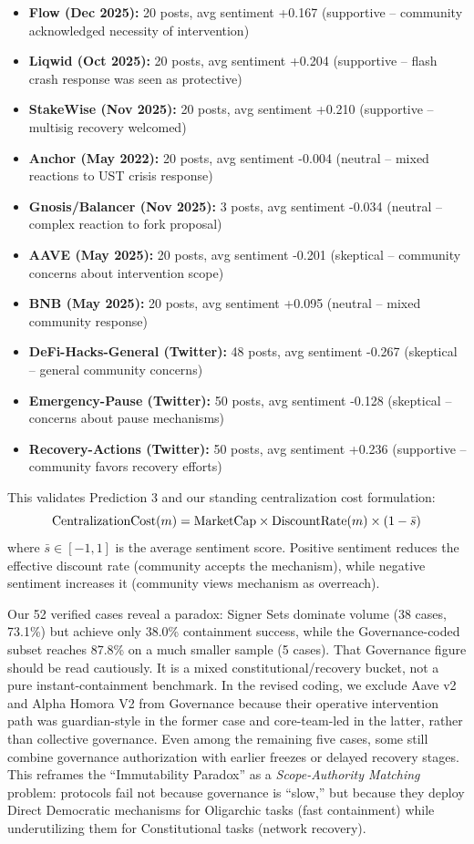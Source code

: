 \documentclass[12pt]{article}
\newif\ifconcise
\begin{document}
\begin{itemize}
    \item \textbf{Flow (Dec 2025):} 20 posts, avg sentiment +0.167 (supportive -- community acknowledged necessity of intervention)
    \item \textbf{Liqwid (Oct 2025):} 20 posts, avg sentiment +0.204 (supportive -- flash crash response was seen as protective)
    \item \textbf{StakeWise (Nov 2025):} 20 posts, avg sentiment +0.210 (supportive -- multisig recovery welcomed)
    \item \textbf{Anchor (May 2022):} 20 posts, avg sentiment -0.004 (neutral -- mixed reactions to UST crisis response)
    \item \textbf{Gnosis/Balancer (Nov 2025):} 3 posts, avg sentiment -0.034 (neutral -- complex reaction to fork proposal)
    \item \textbf{AAVE (May 2025):} 20 posts, avg sentiment -0.201 (skeptical -- community concerns about intervention scope)
    \item \textbf{BNB (May 2025):} 20 posts, avg sentiment +0.095 (neutral -- mixed community response)
    \item \textbf{DeFi-Hacks-General (Twitter):} 48 posts, avg sentiment -0.267 (skeptical -- general community concerns)
    \item \textbf{Emergency-Pause (Twitter):} 50 posts, avg sentiment -0.128 (skeptical -- concerns about pause mechanisms)
    \item \textbf{Recovery-Actions (Twitter):} 50 posts, avg sentiment +0.236 (supportive -- community favors recovery efforts)
\end{itemize}
\fi

This validates Prediction 3 and our standing centralization cost formulation:
\[
\mathrm{CentralizationCost}(m) = \text{MarketCap} \times \text{DiscountRate}(m) \times (1 - \bar{s})
\]
where $\bar{s} \in [-1, 1]$ is the average sentiment score. Positive sentiment reduces the effective discount rate (community accepts the mechanism), while negative sentiment increases it (community views mechanism as overreach).


\ifconcise
Our 52 verified cases reveal a paradox: Signer Sets dominate volume (38 cases, 73.1\%) but achieve only 38.0\% containment success, while the Governance-coded subset reaches 87.8\% on a much smaller sample (5 cases). That Governance figure should be read cautiously. It is a mixed constitutional/recovery bucket, not a pure instant-containment benchmark. In the revised coding, we exclude Aave v2 and Alpha Homora V2 from Governance because their operative intervention path was guardian-style in the former case and core-team-led in the latter, rather than collective governance. Even among the remaining five cases, some still combine governance authorization with earlier freezes or delayed recovery stages. This reframes the ``Immutability Paradox'' as a \emph{Scope-Authority Matching} problem: protocols fail not because governance is ``slow,'' but because they deploy Direct Democratic mechanisms for Oligarchic tasks (fast containment) while underutilizing them for Constitutional tasks (network recovery).
\end{document}
